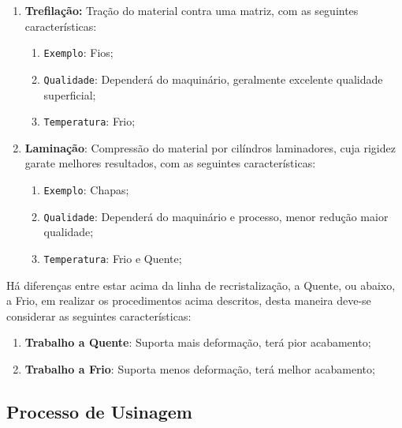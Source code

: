 \documentclass{article}
\begin{document}
\begin{enumerate}[rightmargin = \leftmargin]
                    \item \textbf{Trefilação:} Tração do material contra uma matriz, com as seguintes características:
                        \begin{enumerate}[rightmargin = \leftmargin, noitemsep]
                            \item \texttt{Exemplo}: Fios;
                            \item \texttt{Qualidade}: Dependerá do maquinário, geralmente excelente qualidade superficial;
                            \item \texttt{Temperatura}: Frio;
                        \end{enumerate}

                    \item \textbf{Laminação}: Compressão do material por cilíndros laminadores, cuja rigidez garate melhores resultados, com as seguintes características:
                        \begin{enumerate}[rightmargin = \leftmargin, noitemsep]
                            \item \texttt{Exemplo}: Chapas;
                            \item \texttt{Qualidade}: Dependerá do maquinário e processo, menor redução maior qualidade;
                            \item \texttt{Temperatura}: Frio e Quente;
                        \end{enumerate}
                \end{enumerate}
            Há diferenças entre estar acima da linha de recristalização, a Quente, ou abaixo, a Frio, em realizar os procedimentos acima descritos, desta maneira deve-se considerar as seguintes características:
                \begin{enumerate}[rightmargin = \leftmargin, noitemsep]
                    \item \textbf{Trabalho a Quente}: Suporta mais deformação, terá pior acabamento; 
                    \item \textbf{Trabalho a Frio}: Suporta menos deformação, terá melhor acabamento; 
                \end{enumerate}

        \subsection{Processo de Usinagem}
\end{document}
